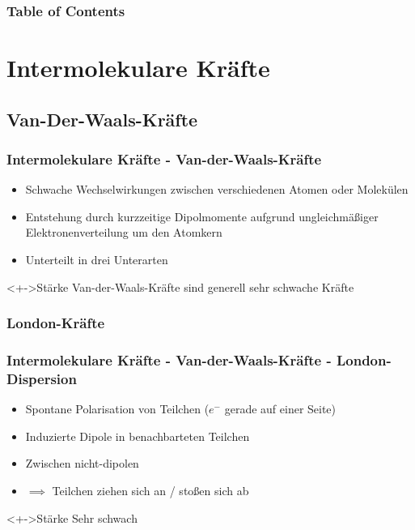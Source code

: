 \begin{frame}
\frametitle{Table of Contents}
\tableofcontents
\end{frame}


\section{Intermolekulare Kräfte}
\subsection{Van-Der-Waals-Kräfte}
\begin{frame}
\frametitle{Intermolekulare Kräfte - Van-der-Waals-Kräfte}
\begin{itemize}
	\item<+-> Schwache Wechselwirkungen zwischen verschiedenen Atomen oder Molekülen
	\item<+-> Entstehung durch kurzzeitige Dipolmomente aufgrund ungleichmäßiger Elektronenverteilung um den Atomkern
	\item<+-> Unterteilt in drei Unterarten
\end{itemize}
\begin{block}<+->{Stärke}
	Van-der-Waals-Kräfte sind generell sehr schwache Kräfte
\end{block}
\end{frame}

\subsubsection{London-Kräfte}
\begin{frame}
\frametitle{Intermolekulare Kräfte - Van-der-Waals-Kräfte - London-Dispersion}
\begin{itemize}
	\item<+-> Spontane Polarisation von Teilchen ($e^-$  gerade auf einer Seite)
	\item<+-> Induzierte Dipole in benachbarteten Teilchen
	\item<+-> Zwischen nicht-dipolen
	\item<+-> $\implies$ Teilchen ziehen sich an / stoßen sich ab
\end{itemize}
\begin{block}<+->{Stärke}
	Sehr schwach
\end{block}
\end{frame}

